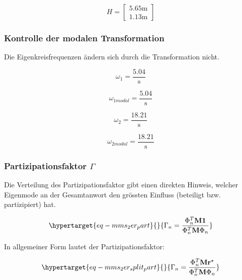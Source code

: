 \documentclass[
  letterpaper,
  DIV=11]{scrreprt}
\begin{document}
\begin{equation}H = \left[\begin{matrix}5.65 \text{m}\\1.13 \text{m}\end{matrix}\right]\end{equation}

\hypertarget{kontrolle-der-modalen-transformation-3}{%
\subsubsection{Kontrolle der modalen
Transformation}\label{kontrolle-der-modalen-transformation-3}}

Die Eigenkreisfrequenzen ändern sich durch die Transformation nicht.

\begin{equation}\omega_{1} = \frac{5.04}{\text{s}}\end{equation}

\begin{equation}\omega_{1 modal} = \frac{5.04}{\text{s}}\end{equation}

\begin{equation}\omega_{2} = \frac{18.21}{\text{s}}\end{equation}

\begin{equation}\omega_{2 modal} = \frac{18.21}{\text{s}}\end{equation}

\hypertarget{partizipationsfaktor-gamma-2}{%
\subsubsection{\texorpdfstring{Partizipationsfaktor
\(\Gamma\)}{Partizipationsfaktor \textbackslash Gamma}}\label{partizipationsfaktor-gamma-2}}

Die Verteilung des Partizipationsfaktor gibt einen direkten Hinweis,
welcher Eigenmode an der Gesamtanwort den grössten Einfluss (beteiligt
bzw. partizipiert) hat.

\begin{equation}\protect\hypertarget{eq-mms_2er_part}{}{
\Gamma_n = \frac{\Phi_n^T \mathbf{M 1}}{\Phi_n^T \mathbf{M}\Phi_n}
}\label{eq-mms_2er_part}\end{equation}

In allgemeiner Form lautet der Partizipationsfaktor:

\begin{equation}\protect\hypertarget{eq-mms_2er_split_part}{}{
\Gamma_n = \frac{\Phi_n^T \mathbf{M r^\star}}{\Phi_n^T \mathbf{M}\Phi_n}
}\label{eq-mms_2er_split_part}\end{equation}
\end{document}
